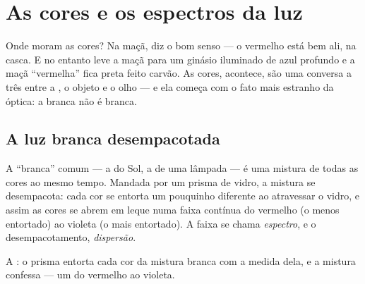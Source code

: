 \chapter{As cores e os espectros da luz}\label{ch:g8:colors-spectra}

Onde moram as cores? Na maçã, diz o bom senso --- o vermelho está
bem ali, na casca. E no entanto leve a maçã para um ginásio iluminado
de azul profundo e a maçã ``vermelha'' fica preta feito carvão. As
cores, acontece, são uma conversa a três entre a , o objeto e o
olho --- e ela começa com o fato mais estranho da óptica: a 
branca não é branca.

\section{A luz branca desempacotada}

\begin{proposition}\label{prop:g8:colors-spectra:mixture}
A  ``branca'' comum --- a do Sol, a de uma lâmpada --- é uma
mistura de todas as cores ao mesmo tempo. Mandada por um prisma de
vidro, a mistura se desempacota: cada cor se entorta um pouquinho
diferente ao atravessar o vidro, e assim as cores se abrem em leque
numa faixa contínua do vermelho (o menos entortado) ao violeta (o
mais entortado). A faixa se chama \emph{espectro}, e o
desempacotamento, \emph{dispersão}.
\end{proposition}

\begin{omfigure}

{\small A : o prisma entorta cada cor da mistura branca com
a medida dela, e a mistura confessa --- um  do vermelho ao
violeta.}
\end{omfigure}

